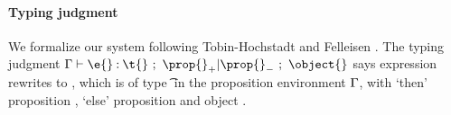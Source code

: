 %

\paragraph{Typing judgment}

We formalize our system following Tobin-Hochstadt and Felleisen \cite{TF10}.
The typing judgment 
$
{\judgementrewrite   {\propenv}
              {\e{}} {\t{}}
  {\filterset {\thenprop {\prop{}}}
              {\elseprop {\prop{}}}}
  {\object{}}
  {\ep{}}}
$
says expression \e{} rewrites to \ep{}, which
is of type \t{} in the 
proposition environment $\Gamma{}$, with 
`then' proposition {\thenprop {\prop{}}}, `else' proposition {\elseprop {\prop{}}}
and object \object{}. 

